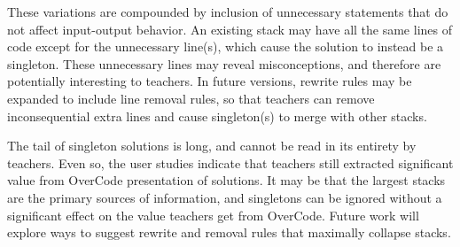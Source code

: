 \documentclass[12pt,twoside]{mitthesis}
\begin{document}
These variations are compounded by inclusion of unnecessary statements that do not affect input-output behavior. An existing stack may have all the same lines of code except for the unnecessary line(s), which cause the solution to instead be a singleton. These unnecessary lines may reveal misconceptions, and therefore are potentially interesting to teachers. In future versions, rewrite rules may be expanded to include line removal rules, so that teachers can remove inconsequential extra lines and cause singleton(s) to merge with other stacks. 

The tail of singleton solutions is long, and cannot be read in its entirety by teachers. Even so, the user studies indicate that teachers still extracted significant value from OverCode presentation of solutions. It may be that the largest stacks are the primary sources of information, and singletons can be ignored without a significant effect on the value teachers get from OverCode. Future work will explore ways to suggest rewrite and removal rules that maximally collapse stacks.
\end{document}
